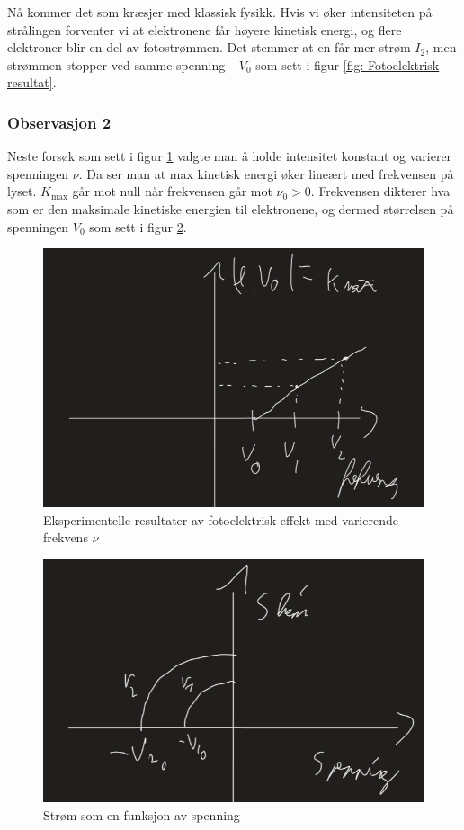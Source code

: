 Nå kommer det som kræsjer med klassisk fysikk. Hvis vi øker intensiteten på strålingen forventer vi at elektronene får høyere kinetisk energi, og flere elektroner blir en del av fotostrømmen. Det stemmer at en får mer strøm $I_2$, men strømmen stopper ved samme spenning $-V_0$ som sett i figur \ref{fig: Fotoelektrisk resultat}. 

\subsubsection{Observasjon 2}
Neste forsøk som sett i figur \ref{fig: Fotoelektrisk resultat 2} valgte man å holde intensitet konstant og varierer spenningen $ν$. Da ser man at max kinetisk energi øker lineært med frekvensen på lyset. $K_{\text{max}}$ går mot null når frekvensen går mot $ν_0 > 0$. Frekvensen dikterer hva som er den maksimale kinetiske energien til elektronene, og dermed størrelsen på spenningen $V_0$ som sett i figur \ref{fig: fotoelektrisk resultat 2.1}.
\begin{figure}[h!]
  \centering
  \includegraphics[scale = .4]{Figures/Fotoelektrisk resultat 2.png}
  \caption{Eksperimentelle resultater av fotoelektrisk effekt med varierende frekvens $ν$}
  \label{fig: Fotoelektrisk resultat 2}
\end{figure}

\begin{figure}[h!]
    \centering
    \includegraphics[scale = .4]{Figures/fotoelektrisk resultat 2.1.png}
    \caption{Strøm som en funksjon av spenning}
    \label{fig: fotoelektrisk resultat 2.1}
  \end{figure}



